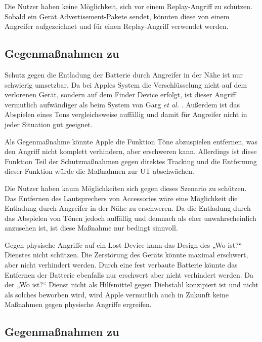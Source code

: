 Die Nutzer haben keine Möglichkeit, sich vor einem Replay-Angriff zu schützen.
Sobald ein Gerät Advertisement-Pakete sendet, könnten diese von einem Angreifer aufgezeichnet und für einen Replay-Angriff verwendet werden.


\subsection{Gegenmaßnahmen zu }

Schutz gegen die Entladung der Batterie durch Angreifer in der Nähe ist nur schwierig umsetzbar.
Da bei Apples System die Verschlüsselung nicht auf dem verlorenen Gerät, sondern auf dem Finder Device erfolgt, ist dieser Angriff vermutlich aufwändiger als beim System von Garg \textit{et al.} \cite{Garg_Secure_Tracker}.
Außerdem ist das Abspielen eines Tons vergleichsweise auffällig und damit für Angreifer nicht in jeder Situation gut geeignet.

Als Gegenmaßnahme könnte Apple die Funktion Töne abzuspielen entfernen, was den Angriff nicht komplett verhindern, aber erschweren kann.
Allerdings ist diese Funktion Teil der Schutzmaßnahmen gegen direktes Tracking und die Entfernung dieser Funktion würde die Maßnahmen zur \ac{UT} abschwächen.

Die Nutzer haben kaum Möglichkeiten sich gegen dieses Szenario zu schützen. 
Das Entfernen des Lautsprechers von Accessories wäre eine Möglichkeit die Entladung durch Angreifer in der Nähe zu erschweren.
Da die Entladung durch das Abspielen von Tönen jedoch auffällig und demnach als eher unwahrscheinlich anzusehen ist, ist diese Maßnahme nur bedingt sinnvoll.

Gegen physische Angriffe auf ein Lost Device kann das Design des „Wo ist?“ Dienstes nicht schützen.
Die Zerstörung des Geräts könnte maximal erschwert, aber nicht verhindert werden.
Durch eine fest verbaute Batterie könnte das Entfernen der Batterie ebenfalls nur erschwert aber nicht verhindert werden.
Da der „Wo ist?“ Dienst nicht als Hilfsmittel gegen Diebstahl konzipiert ist und nicht als solches beworben \cite{Apple_WoIst} wird, wird Apple vermutlich auch in Zukunft keine Maßnahmen gegen physische Angriffe ergreifen.


\subsection{Gegenmaßnahmen zu }

